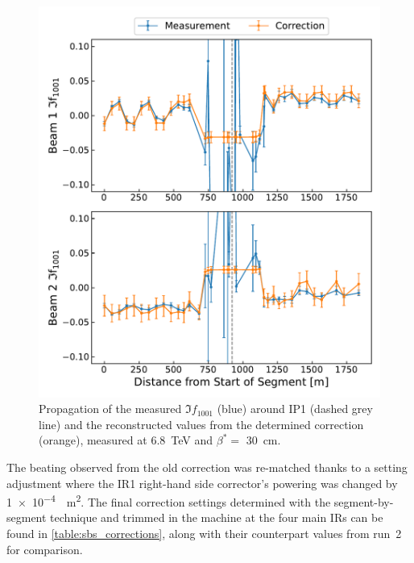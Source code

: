 \begin{figure}[!htb]
    \centering
    \includegraphics*[width=\textwidth]{Figures/IR_Coupling_Correction/commissioning_sbs_imag_f1001_ip1.pdf}
    \caption{Propagation of the measured \(\Im f_{1001}\) (\textcolor{mplblue}{blue}) around IP\num{1} (dashed grey line) and the reconstructed values from the determined correction (\textcolor{mplorange}{orange}), measured at \qty{6.8}{\tera\electronvolt} and \(\beta^{*}=\) \qty{30}{\centi\meter}.}
    \label{figure:commissioning_sbs_imag_f1001_ip1}
\end{figure}

The beating observed from the old correction was re-matched thanks to a setting adjustment where the IR\num{1} right-hand side corrector's powering was changed by \qty{1e-4}{\per\square\meter}.
The final correction settings determined with the segment-by-segment technique and trimmed in the machine at the four main \glspl{IR} can be found in \cref{table:sbs_corrections}, along with their counterpart values from \Gls{run}~\num{2} for comparison.

